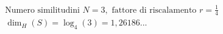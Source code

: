 \documentclass[preview]{standalone}
\begin{document}
\begin{align*}
&\text{Numero similitudini } N = 3, \text{ fattore di riscalamento } r = \frac{1}{4} \\ &\dim_H(S) = \log_{4}(3) = 1,26186...
\end{align*}
\end{document}
